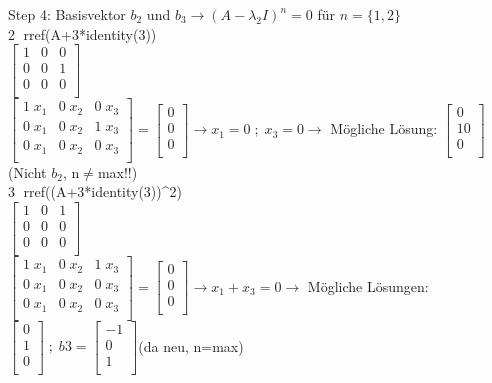 Step 4: Basisvektor $b_2$ und $b_3 \rightarrow (A- \lambda_2 I)^n = 0$ für $n=\{1,2\}$\\
\textcircled{2} rref(A+3*identity(3))\\
\hspace*{2cm}$\begin{bmatrix}
	1 & 0 & 0\\
	0 & 0 & 1\\
	0 & 0 & 0\\
\end{bmatrix}$\\

$\begin{bmatrix}
	1\;x_1 & 0\;x_2 & 0\;x_3\\
	0\;x_1 & 0\;x_2 & 1\;x_3\\
	0\;x_1 & 0\;x_2 & 0\;x_3\\
\end{bmatrix} = \begin{bmatrix}
	0\\
	0\\
	0\\
\end{bmatrix} \rightarrow x_1=0 \; ; \; x_3=0 \rightarrow$ Mögliche Lösung: $\begin{bmatrix}
	0\\
	10\\
	0\\
\end{bmatrix}$ (Nicht $b_2$, n$\neq$max!!)\\

\textcircled{3} rref((A+3*identity(3))\textasciicircum2)\\
\hspace*{2cm}$\begin{bmatrix}
	1 & 0 & 1\\
	0 & 0 & 0\\
	0 & 0 & 0\\
\end{bmatrix}$\\

$\begin{bmatrix}
	1\;x_1 & 0\;x_2 & 1\;x_3\\
	0\;x_1 & 0\;x_2 & 0\;x_3\\
	0\;x_1 & 0\;x_2 & 0\;x_3\\
\end{bmatrix} = \begin{bmatrix}
	0\\
	0\\
	0\\
\end{bmatrix} \rightarrow x_1 + x_3=0 \rightarrow$ Mögliche Lösungen: $\begin{bmatrix}
	0\\
	1\\
	0\\
\end{bmatrix} \; ; \; b3 = \begin{bmatrix}
	-1\\
	0\\
	1\\
\end{bmatrix}$(da neu, n=max)\\

